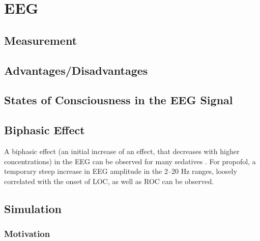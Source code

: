 \section{EEG}\label{sec:eeg}

\subsection{Measurement}\label{subsec:measurement}
\qquad {}




\subsection{Advantages/Disadvantages}\label{subsec:advantages/disadvantages}
\qquad {}
\subsection{States of Consciousness in the EEG Signal}\label{subsec:states-of-consciousness-in-the-eeg-signal}
\qquad {}




\subsection{Biphasic Effect}

A biphasic effect (an initial increase of an effect, that decreases with higher concentrations) in the EEG can be
observed for many sedatives \cite{kuizenga_quantitative_1998, kuizenga_biphasic_2001}.
For propofol, a temporary steep increase in EEG amplitude in the 2--20 Hz ranges, loosely correlated with the onset of
LOC, as well as ROC can be observed.




\subsection{Simulation}\label{subsec:simulation}

\subsubsection{Motivation}
 \qquad \qquad {}
